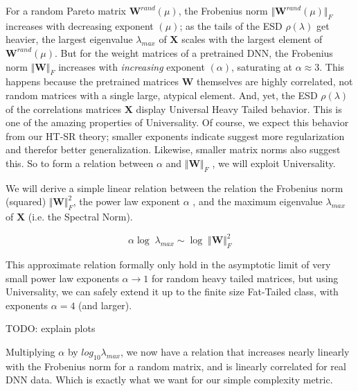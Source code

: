 { For a random Pareto matrix $\mathbf{W}^{rand}(\mu)$,  the Frobenius norm  $\Vert\mathbf{W}^{rand}(\mu)\Vert_{F}$ increases with 
 decreasing exponent $(\mu)$;  as the tails of the ESD $\rho(\lambda)$ get heavier, the largest eigenvalue $\lambda_{max}$ of $\mathbf{X}$
  scales with the largest element of  $\mathbf{W}^{rand}(\mu)$.  But for the weight matrices of a pretrained DNN,
  the Frobenius norm $\Vert\mathbf{W}\Vert_{F}$ increases with \emph{increasing} exponent $(\alpha)$, saturating at $\alpha\approx 3$.
  This happens because the pretrained matrices  $\mathbf{W}$ themselves are highly correlated, not random matrices
  with a single large, atypical element.   And, yet, the ESD $\rho(\lambda)$ of the correlations matrices $\mathbf{X}$ display
  Universal Heavy Tailed behavior. This is one of the amazing properties of Universality.
  Of course, we expect this behavior from our  HT-SR theory; smaller exponents indicate suggest more regularization
  and therefor better generalization.  Likewise, smaller matrix norms also suggest this.  
  So to form a relation between $\alpha$ and  $\Vert\mathbf{W}\Vert_{F}$ , we will exploit Universality.  

We will derive a simple linear relation between the relation the Frobenius norm (squared) $\Vert\mathbf{W}\Vert^{2}_{F}$, the
power law exponent  $\alpha$ , and the maximum eigenvalue $\lambda_{max}$ of $\mathbf{X}$ (i.e. the Spectral Norm).  

$$\alpha\log\;\lambda_{max}\sim\log\;\Vert\mathbf{W}\Vert^{2}_{F}$$

This approximate relation formally only hold in the asymptotic limit of very small power law exponents $\alpha\rightarrow 1$ for
random heavy tailed matrices, but using Universality, we can safely extend it up to the finite size Fat-Tailed class, with
exponents $\alpha=4$ (and larger).  

TODO:  explain plots

Multiplying $\alpha$ by $log_{10}\lambda_{max}$, we now have a relation that increases nearly linearly with the Frobenius norm
for a random matrix, and is linearly correlated for real DNN data. Which is exactly what we want for our simple complexity metric.


}
